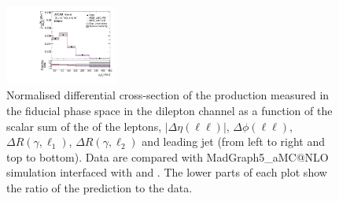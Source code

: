 \begin{figure}[ht]
  \includegraphics[width=0.33\textwidth]{figures/diff_xsec/normalized-unfolded-distributions/tty_prod_dilep/DL_tty_prod_ptj1_unfolded_normalized.pdf}%
  \caption{Normalised differential cross-section of the \tty production measured in the fiducial phase space in the dilepton channel as a function of the scalar sum of the \pt of the leptons, $|\Delta \eta(\ell\ell)|$, $\Delta \phi (\ell\ell)$, $\Delta R (\gamma, \ell_1)$, $\Delta R (\gamma, \ell_2)$ and leading jet \pt (from left to right and top to bottom). Data are compared with MadGraph5\_aMC@NLO simulation interfaced with \PYTHIA[8] and \HERWIG[7]. The lower parts of each plot show the ratio of the prediction to the data.}
  \label{fig:tty_prod_diff_DL2_norm}
\end{figure}
\FloatBarrier

